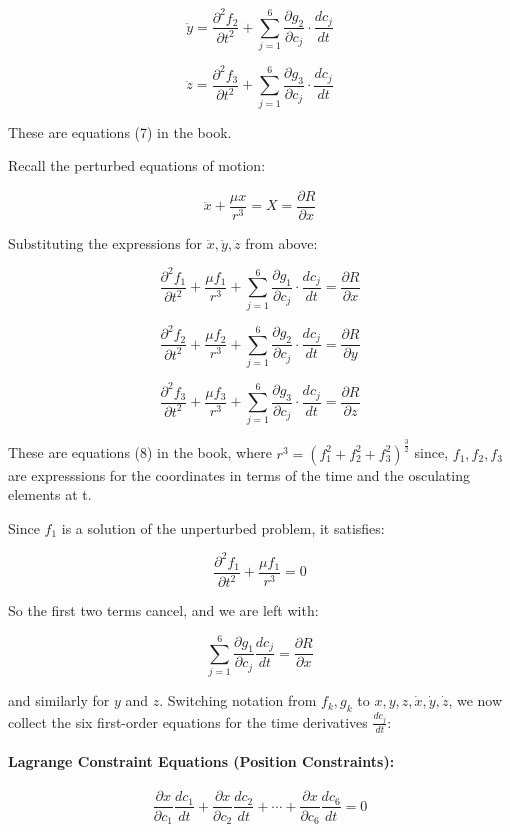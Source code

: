 \documentclass{article}
\begin{document}
\[
\ddot{y} = \frac{\partial^2 f_2}{\partial t^2} + \sum_{j=1}^{6} \frac{\partial g_2}{\partial c_j} \cdot \frac{dc_j}{dt}
\]

\[
\ddot{z} = \frac{\partial^2 f_3}{\partial t^2} + \sum_{j=1}^{6} \frac{\partial g_3}{\partial c_j} \cdot \frac{dc_j}{dt}
\]

These are equations (7) in the book.

Recall the perturbed equations of motion:

\[
\ddot{x} + \frac{\mu x}{r^3} = X = \frac{\partial R}{\partial x}
\]

Substituting the expressions for \( \ddot{x}, \ddot{y}, \ddot{z} \) from above:

\[
\frac{\partial^2 f_1}{\partial t^2} + \frac{\mu f_1}{r^3} + \sum_{j=1}^{6} \frac{\partial g_1}{\partial c_j} \cdot \frac{dc_j}{dt} = \frac{\partial R}{\partial x}
\]

\[
\frac{\partial^2 f_2}{\partial t^2} + \frac{\mu f_2}{r^3} + \sum_{j=1}^{6} \frac{\partial g_2}{\partial c_j} \cdot \frac{dc_j}{dt} = \frac{\partial R}{\partial y}
\]

\[
\frac{\partial^2 f_3}{\partial t^2} + \frac{\mu f_3}{r^3} + \sum_{j=1}^{6} \frac{\partial g_3}{\partial c_j} \cdot \frac{dc_j}{dt} = \frac{\partial R}{\partial z}
\]

These are equations (8) in the book, where $r^3 = (f_1^2 + f_2^2 + f_3^2)^{\frac{3}{2}}$ since, $f_1, f_2, f_3$ are expresssions for the coordinates in terms of the time and the osculating elements at t. 


Since \( f_1 \) is a solution of the unperturbed problem, it satisfies:

\[
\frac{\partial^2 f_1}{\partial t^2} + \frac{\mu f_1}{r^3} = 0
\]

So the first two terms cancel, and we are left with:

\[
\sum_{j=1}^6 \frac{\partial g_1}{\partial c_j} \frac{dc_j}{dt} = \frac{\partial R}{\partial x}
\]

and similarly for \( y \) and \( z \). Switching notation from \( f_k, g_k \) to \( x, y, z, \dot{x}, \dot{y}, \dot{z} \), we now collect the six first-order equations for the time derivatives \( \frac{dc_j}{dt} \):

\paragraph{Lagrange Constraint Equations (Position Constraints):}

\[
\frac{\partial x}{\partial c_1} \frac{dc_1}{dt}
+ \frac{\partial x}{\partial c_2} \frac{dc_2}{dt}
+ \cdots
+ \frac{\partial x}{\partial c_6} \frac{dc_6}{dt} = 0
\]
\end{document}
